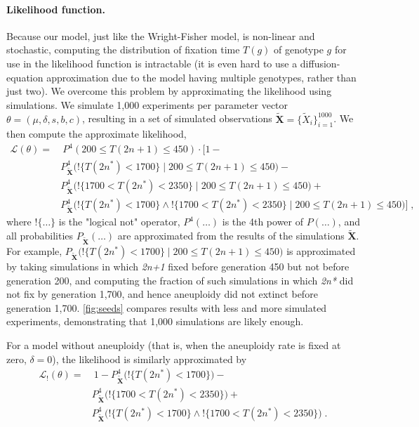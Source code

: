 \documentclass[12pt]{extarticle}
\let\vec\mathbf
\newcommand{\likelihood}{\mathcal{L}}
\newcommand{\anwt}{\emph{2n+1}}
\newcommand{\eumt}{\emph{2n*}}
\begin{document}
\paragraph{Likelihood function.} 
Because our model, just like the Wright-Fisher model, is non-linear and stochastic, computing the distribution of fixation time $T(g)$ of genotype $g$ for use in the likelihood function is intractable (it is even hard to use a diffusion-equation approximation due to the model having multiple genotypes, rather than just two).
We overcome this problem by approximating the likelihood using simulations. We simulate 1,000 experiments per parameter vector $\theta = (\mu, \delta, s, b, c)$, resulting in a set of simulated observations $\tilde{\vec X} = \{\tilde{X}_i\}_{i=1}^{1000}$. We then compute the approximate likelihood,
\begin{equation}\begin{aligned}
\label{eq:heatstress-likelihood}
\likelihood(\theta) = &\ P^4(200 \le T(2n+1) \le 450) \cdot 
	\Big[1 - \\
	&	P_{\tilde{\vec X}}^4\big(!\{T(2n^*)<1700\} \mid 200 \le T(2n+1) \le 450\big)- \\
	&	P_{\tilde{\vec X}}^4\big(!\{1700 < T(2n^*) < 2350\} \mid 200 \le T(2n+1) \le 450\big)+ \\
	&	P_{\tilde{\vec X}}^4\big(!\{T(2n^*)<1700\} \land !\{1700 < T(2n^*) < 2350\} \mid 200 \le T(2n+1) \le 450\big) 
	\Big]\;,
\end{aligned}\end{equation}
where $!\{\ldots\}$ is the "logical not" operator, $P^4(\ldots)$ is the 4th power of $P(\ldots)$, and all probabilities $P_{\tilde{\vec X}}(\ldots)$ are approximated from the results of the simulations $\tilde{\vec X}$. For example, $P_{\tilde{\vec X}}\big(!\{T(2n^*)<1700\} \mid 200 \le T(2n+1) \le 450\big)$ is approximated by taking simulations in which \anwt\; fixed before generation 450 but not before generation 200, and computing the fraction of such simulations in which \eumt\; did not fix by generation 1,700, and hence aneuploidy did not extinct before generation 1,700.
\autoref{fig:seeds} compares results with less and more simulated experiments, demonstrating that 1,000 simulations are likely enough.
 
For a model without aneuploidy (that is, when the aneuploidy rate is fixed at zero, $\delta=0$), 
the likelihood is similarly approximated by
\begin{equation}\begin{aligned}
\label{eq:heatstress-noaneuploidy-likelihood}
\likelihood_{!}(\theta) = &\ 
	1 - 
	P_{\tilde{\vec X}}^4\big(!\{T(2n^*)<1700\}\big) - \\
&	P_{\tilde{\vec X}}^4\big(!\{1700 < T(2n^*) < 2350\}\big) + \\
&	P_{\tilde{\vec X}}^4\big(!\{T(2n^*)<1700\} \land !\{1700 < T(2n^*) < 2350\}\big)
\;.
\end{aligned}\end{equation}
\end{document}
